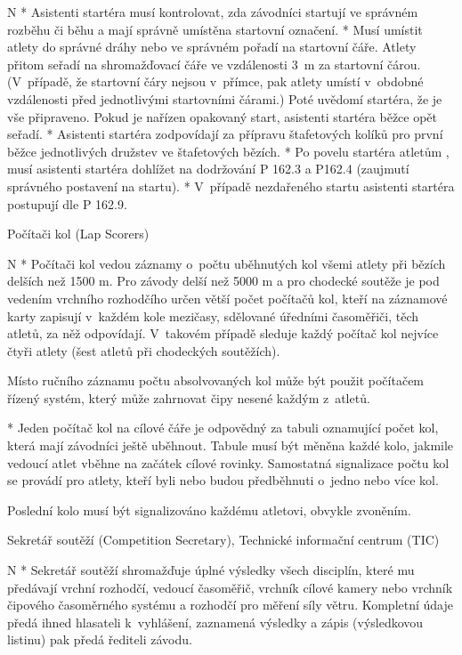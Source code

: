 \begitems \style N
* Asistenti startéra musí kontrolovat, zda závodníci startují ve správném rozběhu či běhu a mají správně umístěna startovní označení.
* Musí umístit atlety do správné dráhy nebo ve správném pořadí na startovní čáře. Atlety přitom seřadí na shromažďovací čáře ve vzdálenosti 3~m za startovní čárou. (V~případě, že startovní čáry nejsou v~přímce, pak atlety umístí v~obdobné vzdálenosti před jednotlivými startovními čárami.) Poté uvědomí startéra, že je vše připraveno. Pokud je nařízen opakovaný start, asistenti startéra běžce opět seřadí.
* Asistenti startéra zodpovídají za přípravu štafetových kolíků pro první běžce jednotlivých družstev ve štafetových bězích.
* Po povelu startéra atletům , musí asistenti startéra dohlížet na dodržování P 162.3 a P162.4 (zaujmutí správného postavení na startu).
* V~případě nezdařeného startu asistenti startéra postupují dle P 162.9.
\enditems

\secc Počítači kol (Lap Scorers)

\begitems \style N
* Počítači kol vedou záznamy o~počtu uběhnutých kol všemi atlety při bězích delších než 1500 m. Pro závody delší než 5000 m a pro chodecké soutěže je pod vedením vrchního rozhodčího určen větší počet počítačů kol, kteří na záznamové karty zapisují v~každém kole mezičasy, sdělované úředními časoměřiči, těch atletů, za něž odpovídají. V~takovém případě sleduje každý počítač kol nejvíce čtyři atlety (šest atletů při chodeckých soutěžích).

Místo ručního záznamu počtu absolvovaných kol může být použit počítačem řízený systém, který může zahrnovat čipy nesené každým z~atletů.

* Jeden počítač kol na cílové čáře je odpovědný za tabuli oznamující počet kol, která mají závodníci ještě uběhnout. Tabule musí být měněna každé kolo, jakmile vedoucí atlet vběhne na začátek cílové rovinky. Samostatná signalizace počtu kol se provádí pro atlety, kteří byli nebo budou předběhnuti o~jedno nebo více kol.

Poslední kolo musí být signalizováno každému atletovi, obvykle zvoněním.
\enditems

\secc Sekretář soutěží (Competition Secretary), Technické informační centrum (TIC)

\begitems \style N
* Sekretář soutěží shromažďuje úplné výsledky všech disciplín, které mu předávají vrchní rozhodčí, vedoucí časoměřič, vrchník cílové kamery nebo vrchník čipového časoměrného systému a rozhodčí pro měření síly větru. Kompletní údaje předá ihned hlasateli k~vyhlášení, zaznamená výsledky a zápis (výsledkovou listinu) pak předá řediteli závodu.

